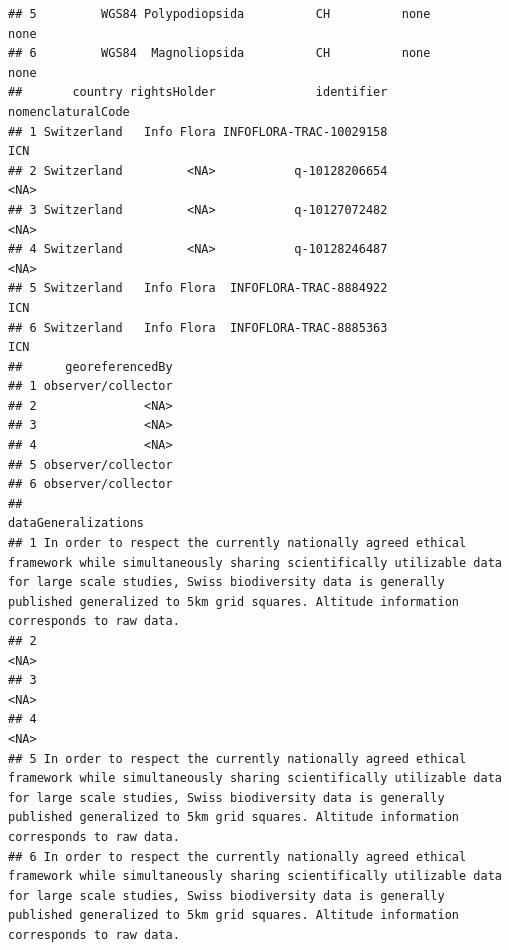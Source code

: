 \documentclass[
]{book}
\begin{document}
\begin{verbatim}
## 5         WGS84 Polypodiopsida          CH          none            none
## 6         WGS84  Magnoliopsida          CH          none            none
##       country rightsHolder              identifier nomenclaturalCode
## 1 Switzerland   Info Flora INFOFLORA-TRAC-10029158               ICN
## 2 Switzerland         <NA>           q-10128206654              <NA>
## 3 Switzerland         <NA>           q-10127072482              <NA>
## 4 Switzerland         <NA>           q-10128246487              <NA>
## 5 Switzerland   Info Flora  INFOFLORA-TRAC-8884922               ICN
## 6 Switzerland   Info Flora  INFOFLORA-TRAC-8885363               ICN
##      georeferencedBy
## 1 observer/collector
## 2               <NA>
## 3               <NA>
## 4               <NA>
## 5 observer/collector
## 6 observer/collector
##                                                                                                                                                                                                                                                                        dataGeneralizations
## 1 In order to respect the currently nationally agreed ethical framework while simultaneously sharing scientifically utilizable data for large scale studies, Swiss biodiversity data is generally published generalized to 5km grid squares. Altitude information corresponds to raw data.
## 2                                                                                                                                                                                                                                                                                     <NA>
## 3                                                                                                                                                                                                                                                                                     <NA>
## 4                                                                                                                                                                                                                                                                                     <NA>
## 5 In order to respect the currently nationally agreed ethical framework while simultaneously sharing scientifically utilizable data for large scale studies, Swiss biodiversity data is generally published generalized to 5km grid squares. Altitude information corresponds to raw data.
## 6 In order to respect the currently nationally agreed ethical framework while simultaneously sharing scientifically utilizable data for large scale studies, Swiss biodiversity data is generally published generalized to 5km grid squares. Altitude information corresponds to raw data.

\end{verbatim}
\end{document}
